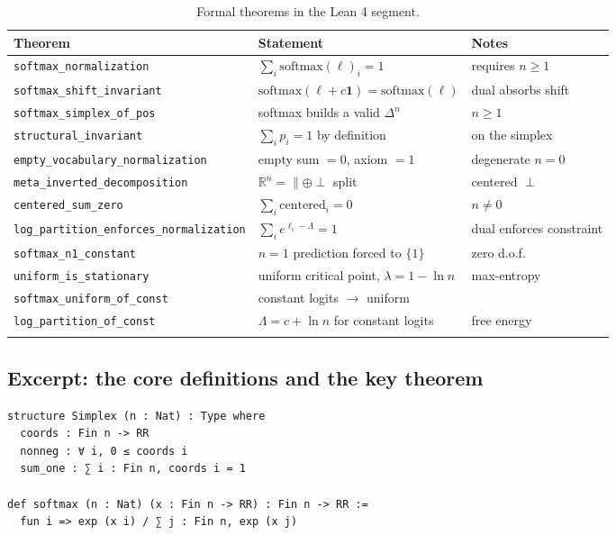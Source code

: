 \documentclass[11pt]{article}
\newcommand{\simplex}[1]{\Delta^{#1}}
\newcommand{\RR}{\mathbb{R}}
\newcommand{\softmax}{\mathrm{softmax}}
\begin{document}
\begin{longtable}{@{}llp{7.5cm}@{}}
\toprule
Theorem & Statement & Notes \\
\midrule
\texttt{softmax\_normalization} & $\sum_i \softmax(\ell)_i = 1$ & requires $n\ge 1$ \\
\texttt{softmax\_shift\_invariant} & $\softmax(\ell+c\mathbf{1})=\softmax(\ell)$ & dual absorbs shift \\
\texttt{softmax\_simplex\_of\_pos} & softmax builds a valid $\simplex{n}$ & $n\ge 1$ \\
\texttt{structural\_invariant} & $\sum_i p_i = 1$ by definition & on the simplex \\
\texttt{empty\_vocabulary\_normalization} & empty sum $=0$, axiom $=1$ & degenerate $n=0$ \\
\texttt{meta\_inverted\_decomposition} & $\RR^n = \parallel\oplus\perp$ split & centered $\perp$ \\
\texttt{centered\_sum\_zero} & $\sum_i \mathrm{centered}_i = 0$ & $n\neq 0$ \\
\texttt{log\_partition\_enforces\_normalization} & $\sum_i e^{\ell_i-\Lambda}=1$ & dual enforces constraint \\
\texttt{softmax\_n1\_constant} & $n=1$ prediction forced to $\{1\}$ & zero d.o.f. \\
\texttt{uniform\_is\_stationary} & uniform critical point, $\lambda=1-\ln n$ & max-entropy \\
\texttt{softmax\_uniform\_of\_const} & constant logits $\to$ uniform & \\
\texttt{log\_partition\_of\_const} & $\Lambda=c+\ln n$ for constant logits & free energy \\
\bottomrule
\caption{Formal theorems in the Lean 4 segment.}
\label{tab:lean}
\end{longtable}

\subsection{Excerpt: the core definitions and the key theorem}
\label{sec:lean-excerpt}

\begin{lstlisting}[language=lean, caption={Core definitions (excerpt).}]
structure Simplex (n : Nat) : Type where
  coords : Fin n -> RR
  nonneg : ∀ i, 0 ≤ coords i
  sum_one : ∑ i : Fin n, coords i = 1

def softmax (n : Nat) (x : Fin n -> RR) : Fin n -> RR :=
  fun i => exp (x i) / ∑ j : Fin n, exp (x j)
\end{lstlisting}
\end{document}
